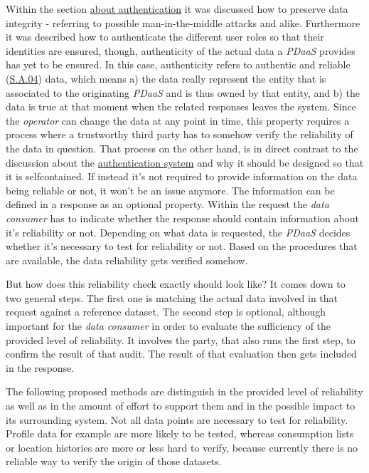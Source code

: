 \documentclass[12pt,english,a4paper,titlepage,cleardoublepage=empty,dottedtoc]{report}
\begin{document}
Within the section \protect\hyperlink{authentication}{about
authentication} it was discussed how to preserve data integrity -
referring to possible man-in-the-middle attacks and alike. Furthermore
it was described how to authenticate the different user roles so that
their identities are ensured, though, authenticity of the actual data a
\emph{PDaaS} provides has yet to be ensured. In this case, authenticity
refers to authentic and reliable (\protect\hyperlink{sa04}{S.A.04})
data, which means a) the data really represent the entity that is
associated to the originating \emph{PDaaS} and is thus owned by that
entity, and b) the data is true at that moment when the related
responses leaves the system. Since the \emph{operator} can change the
data at any point in time, this property requires a process where a
trustworthy third party has to somehow verify the reliability of the
data in question. That process on the other hand, is in direct contrast
to the discussion about the
\protect\hyperlink{authentication}{authentication system} and why it
should be designed so that it is selfcontained. If instead it's not
required to provide information on the data being reliable or not, it
won't be an issue anymore. The information can be defined in a response
as an optional property. Within the request the \emph{data consumer} has
to indicate whether the response should contain information about it's
reliability or not. Depending on what data is requested, the
\emph{PDaaS} decides whether it's necessary to test for reliability or
not. Based on the procedures that are available, the data reliability
gets verified somehow.

But how does this reliability check exactly should look like? It comes
down to two general steps. The first one is matching the actual data
involved in that request against a reference dataset. The second step is
optional, although important for the \emph{data consumer} in order to
evaluate the sufficiency of the provided level of reliability. It
involves the party, that also runs the first step, to confirm the result
of that audit. The result of that evaluation then gets included in the
response.

The following proposed methods are distinguish in the provided level of
reliability as well as in the amount of effort to support them and in
the possible impact to its surrounding system. Not all data points are
necessary to test for reliability. Profile data for example are more
likely to be tested, whereas consumption lists or location histories are
more or less hard to verify, because currently there is no reliable way
to verify the origin of those datasets.
\end{document}
